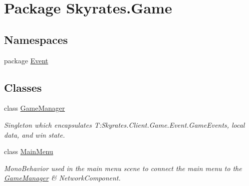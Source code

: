 \hypertarget{namespace_skyrates_1_1_game}{\section{Package Skyrates.\-Game}
\label{namespace_skyrates_1_1_game}
}
\subsection*{Namespaces}
\begin{DoxyCompactItemize}
\item 
package \hyperlink{namespace_skyrates_1_1_game_1_1_event}{Event}
\end{DoxyCompactItemize}
\subsection*{Classes}
\begin{DoxyCompactItemize}
\item 
class \hyperlink{class_skyrates_1_1_game_1_1_game_manager}{Game\-Manager}
\begin{DoxyCompactList}\small\item\em Singleton which encapsulates T\-:\-Skyrates.\-Client.\-Game.\-Event.\-Game\-Events, local data, and win state. \end{DoxyCompactList}\item 
class \hyperlink{class_skyrates_1_1_game_1_1_main_menu}{Main\-Menu}
\begin{DoxyCompactList}\small\item\em Mono\-Behavior used in the main menu scene to connect the main menu to the \hyperlink{class_skyrates_1_1_game_1_1_game_manager}{Game\-Manager} \& Network\-Component. \end{DoxyCompactList}\end{DoxyCompactItemize}

